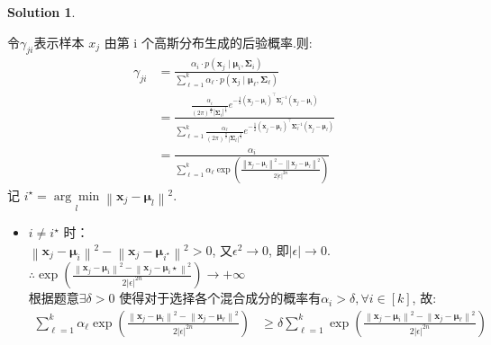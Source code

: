 \documentclass[a4paper,UTF8]{article}
\numberwithin{equation}{section}
\theoremstyle{definition}
\newtheorem*{solution}{Solution}
\begin{document}
\begin{solution}
\begin{enumerate}
令$\gamma_{j i}$表示样本 $x_j$ 由第 i 个高斯分布生成的后验概率.则:
\\ 
$$
\begin{aligned}
\gamma_{j i} & =\frac{\alpha_{i} \cdot p\left(\boldsymbol{x}_{j} \mid \boldsymbol{\mu}_{i}, \boldsymbol{\Sigma}_{i}\right)}{\sum_{\ell=1}^{k} \alpha_{\ell} \cdot p\left(\boldsymbol{x}_{j} \mid \boldsymbol{\mu}_{\ell}, \boldsymbol{\Sigma}_{\ell}\right)}\\
& =\frac{\frac{\alpha_{i}}{(2 \pi)^{\frac{\pi}{2}}\left|\boldsymbol{\Sigma}_{i}\right|^{\frac{1}{2}}} e^{-\frac{1}{2}\left(\boldsymbol{x}_{j}-\boldsymbol{\mu}_{i}\right)^{\top} \boldsymbol{\Sigma}_{i}^{-1}\left(\boldsymbol{x}_{j}-\boldsymbol{\mu}_{i}\right)}}{\sum_{\ell=1}^{k} \frac{\alpha_{\ell}}{(2 \pi)^{\frac{\pi}{2}}\left|\boldsymbol{\Sigma}_{\ell}\right|^{\frac{1}{2}}} e^{-\frac{1}{2}\left(\boldsymbol{x}_{j}-\boldsymbol{\mu}_{\ell}\right)^{\top} \boldsymbol{\Sigma}_{\ell}^{-1}\left(\boldsymbol{x}_{j}-\boldsymbol{\mu}_{\ell}\right)}}\\
& =\frac{\alpha_i}{\sum_{\ell=1}^k \alpha_{\ell} \exp \left(\frac{\left\|\boldsymbol{x}_j-\boldsymbol{\mu}_i\right\|^2-\left\|\boldsymbol{x}_j-\boldsymbol{\mu}_{\ell}\right\|^2}{2|\epsilon|^{2 n}}\right)} 
\end{aligned}
$$
记 $i^{\star}=\underset{l}{\arg \min }\left\|\boldsymbol{x}_j-\boldsymbol{\mu}_{l}\right\|^2$.\\
\begin{itemize}
    \item $i \neq i^{\star}$ 时：\\
    $\left\|\boldsymbol{x}_j-\boldsymbol{\mu}_i\right\|^2-\left\|\boldsymbol{x}_j-\boldsymbol{\mu}_{i^{\star}}\right\|^2>0$, 又$\epsilon^2 \rightarrow 0$, 即$\mid\epsilon\mid\rightarrow 0$.\\
    $\therefore \exp \left(\frac{\left\|\boldsymbol{x}_j-\boldsymbol{\mu}_i\right\|^2-\left\|\boldsymbol{x}_j-\boldsymbol{\mu}_i \star\right\|^2}{2|\epsilon|^{2 n}}\right) \rightarrow+\infty$\\
    根据题意$\exists \delta>0$ 使得对于选择各个混合成分的概率有$\alpha_i>\delta, \forall i \in[k]$, 故:
    $$
    \begin{aligned}
    \sum_{\ell=1}^k \alpha_{\ell} \exp \left(\frac{\left\|\boldsymbol{x}_j-\boldsymbol{\mu}_i\right\|^2-\left\|\boldsymbol{x}_j-\boldsymbol{\mu}_{\ell}\right\|^2}{2|\epsilon|^{2 n}}\right) & \geq \delta \sum_{\ell=1}^k \exp \left(\frac{\left\|\boldsymbol{x}_j-\boldsymbol{\mu}_i\right\|^2-\left\|\boldsymbol{x}_j-\boldsymbol{\mu}_{\ell}\right\|^2}{2|\epsilon|^{2 n}}\right) \\

\end{aligned}$$
\end{itemize}
\end{enumerate}
\end{solution}
\end{document}

